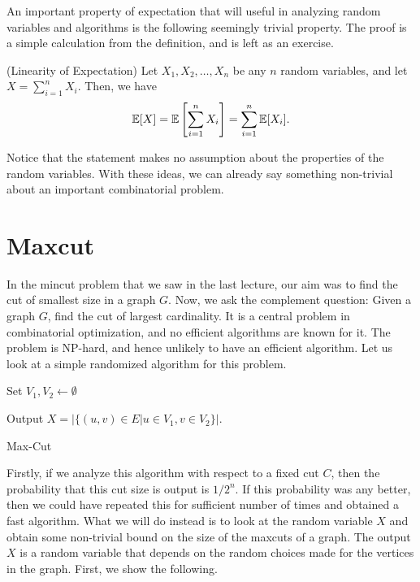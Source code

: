 An important property of expectation that will useful in analyzing random variables and algorithms is the following seemingly trivial property. The proof is a simple calculation from the definition, and is left as an exercise.
\begin{theorem}
	(Linearity of Expectation)
	Let $X_1, X_2, \ldots, X_n$ be any $n$ random variables, and let $X = \sum_{i=1}^n X_i$. Then, we have
	\begin{align*}
		\mathbb{E}[X] = \mathbb{E}\left[\sum_{i=1}^n X_i\right] = \sum_{i=1}^n \mathbb{E}[X_i].
	\end{align*}
	\label{thm:loe}
\end{theorem}
Notice that the statement makes no assumption about the properties of the random variables. With these ideas, we can already say something non-trivial about an important combinatorial problem.

\section{Maxcut}

In the mincut problem that we saw in the last lecture, our aim was to find the cut of smallest size in a graph $G$. Now, we ask the complement question: Given a graph $G$, find the cut of largest cardinality. It is a central problem in combinatorial optimization, and no efficient algorithms are known for it. The problem is NP-hard, and hence unlikely to have an efficient algorithm. Let us look at a simple randomized algorithm for this problem.

\begin{algorithm}
	
	Set $V_1, V_2 \gets \emptyset$
	

	Output $X = |\{(u,v)\in E | u\in V_1, v\in V_2 \}|$.
	\caption{Max-Cut}
	\label{alg:maxcut}
\end{algorithm}

Firstly, if we analyze this algorithm with respect to a fixed cut $C$, then the probability that this cut size is output is $1/2^n$. If this probability was any better, then we could have repeated this for sufficient number of times and obtained a fast algorithm. What we will do instead is to look at the random variable $X$ and obtain some non-trivial bound on the size of the maxcuts of a graph. The output $X$ is a random variable that depends on the random choices made for the vertices in the graph. First, we show the following.

